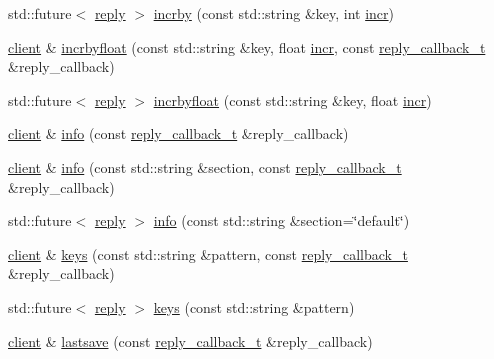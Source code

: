 \begin{DoxyCompactItemize}
\item 
std\+::future$<$ \hyperlink{classcpp__redis_1_1reply}{reply} $>$ \hyperlink{classcpp__redis_1_1client_ab7dbabc00708da38938bb461b195f177}{incrby} (const std\+::string \&key, int \hyperlink{classcpp__redis_1_1client_a2f9ba6c7e83451207403096b19da4faa}{incr})
\item 
\hyperlink{classcpp__redis_1_1client}{client} \& \hyperlink{classcpp__redis_1_1client_a3ae6ca0b7896748a8fe5a450550c422e}{incrbyfloat} (const std\+::string \&key, float \hyperlink{classcpp__redis_1_1client_a2f9ba6c7e83451207403096b19da4faa}{incr}, const \hyperlink{classcpp__redis_1_1client_a061a1140d36d2eaeda82b09a0bb3f9f2}{reply\+\_\+callback\+\_\+t} \&reply\+\_\+callback)
\item 
std\+::future$<$ \hyperlink{classcpp__redis_1_1reply}{reply} $>$ \hyperlink{classcpp__redis_1_1client_a32c78234437f7f02492e3e01dd44bc43}{incrbyfloat} (const std\+::string \&key, float \hyperlink{classcpp__redis_1_1client_a2f9ba6c7e83451207403096b19da4faa}{incr})
\item 
\hyperlink{classcpp__redis_1_1client}{client} \& \hyperlink{classcpp__redis_1_1client_aaa98ba6f8936eaa013ca0df553199f85}{info} (const \hyperlink{classcpp__redis_1_1client_a061a1140d36d2eaeda82b09a0bb3f9f2}{reply\+\_\+callback\+\_\+t} \&reply\+\_\+callback)
\item 
\hyperlink{classcpp__redis_1_1client}{client} \& \hyperlink{classcpp__redis_1_1client_af276159a3938c97e5318dff39a9084ae}{info} (const std\+::string \&section, const \hyperlink{classcpp__redis_1_1client_a061a1140d36d2eaeda82b09a0bb3f9f2}{reply\+\_\+callback\+\_\+t} \&reply\+\_\+callback)
\item 
std\+::future$<$ \hyperlink{classcpp__redis_1_1reply}{reply} $>$ \hyperlink{classcpp__redis_1_1client_aa0186723d51c8b3c92979537e8ad43b9}{info} (const std\+::string \&section=\char`\"{}default\char`\"{})
\item 
\hyperlink{classcpp__redis_1_1client}{client} \& \hyperlink{classcpp__redis_1_1client_acb7845a206b2321e6919c2f38282c322}{keys} (const std\+::string \&pattern, const \hyperlink{classcpp__redis_1_1client_a061a1140d36d2eaeda82b09a0bb3f9f2}{reply\+\_\+callback\+\_\+t} \&reply\+\_\+callback)
\item 
std\+::future$<$ \hyperlink{classcpp__redis_1_1reply}{reply} $>$ \hyperlink{classcpp__redis_1_1client_a1c0804cab9251acde742e725d0af6cbf}{keys} (const std\+::string \&pattern)
\item 
\hyperlink{classcpp__redis_1_1client}{client} \& \hyperlink{classcpp__redis_1_1client_a3b25eaf2691051156748abb69e1b0317}{lastsave} (const \hyperlink{classcpp__redis_1_1client_a061a1140d36d2eaeda82b09a0bb3f9f2}{reply\+\_\+callback\+\_\+t} \&reply\+\_\+callback)

\end{DoxyCompactItemize}
